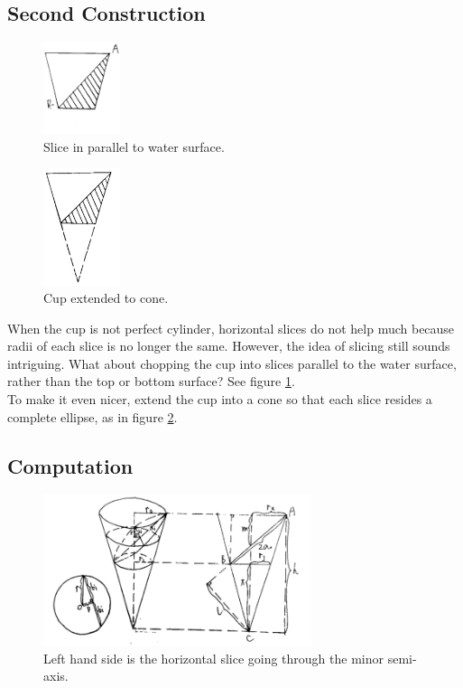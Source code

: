 \documentclass[a4paper]{article}
\begin{document}
\subsection{Second Construction}


\begin{figure}[b]
\centering
\includegraphics[width=0.2\textwidth]{fig/5.png}
\caption{\label{fig:5}Slice in parallel to water surface.}
\end{figure}
\begin{figure}[t]
\centering
\includegraphics[width=0.2\textwidth]{fig/6.png}
\caption{\label{fig:6}Cup extended to cone.}
\end{figure}


When the cup is not perfect cylinder, horizontal slices do not help much because radii of each slice is no longer the same. However, the idea of slicing still sounds intriguing. What about chopping the cup into slices parallel to the water surface, rather than the top or bottom surface? See figure \ref{fig:5}.\\
To make it even nicer, extend the cup into a cone so that each slice resides a complete ellipse, as in figure \ref{fig:6}.\\



\subsection{Computation}

\begin{figure}[b]
\centering
\includegraphics[width=0.7\textwidth]{fig/78.png}
\caption{\label{fig:78}Left hand side is the horizontal slice going through the minor semi-axis.}
\end{figure}
\end{document}
